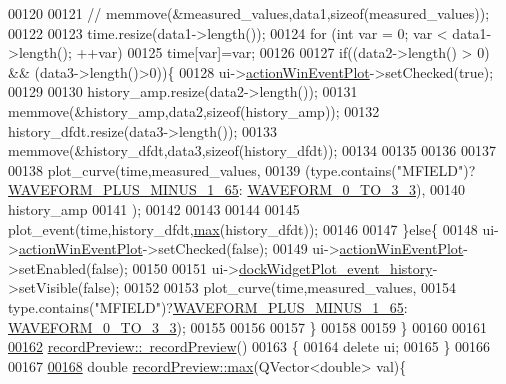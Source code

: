 \begin{DoxyCode}
00120 
00121    \textcolor{comment}{// memmove(&measured\_values,data1,sizeof(measured\_values));}
00122 
00123     time.resize(data1->length());
00124     \textcolor{keywordflow}{for} (\textcolor{keywordtype}{int} var = 0; var < data1->length(); ++var)
00125         time[var]=var;
00126 
00127     \textcolor{keywordflow}{if}((data2->length() > 0) && (data3->length()>0))\{
00128         ui->\hyperlink{a00081_ac72ec9c8679d46fd43a87f99ee6db893}{actionWinEventPlot}->setChecked(\textcolor{keyword}{true});
00129 
00130         history\_amp.resize(data2->length());
00131         memmove(&history\_amp,data2,\textcolor{keyword}{sizeof}(history\_amp));
00132         history\_dfdt.resize(data3->length());
00133         memmove(&history\_dfdt,data3,\textcolor{keyword}{sizeof}(history\_dfdt));
00134 
00135 
00136 
00137 
00138         plot\_curve(time,measured\_values,
00139                   (type.contains(\textcolor{stringliteral}{"MFIELD"})?\hyperlink{a00090_a0923d3b365a36e1e8c401cec964aa36f}{WAVEFORM\_PLUS\_MINUS\_1\_65}:
      \hyperlink{a00090_ae18fed2471b16a8516d721ff60671dd9}{WAVEFORM\_0\_TO\_3\_3}),
00140                   history\_amp
00141                   );
00142 
00143 
00144 
00145         plot\_event(time,history\_dfdt,\hyperlink{a00073_ad38222699419e6ac871ce2a23c6d292e}{max}(history\_dfdt));
00146 
00147     \}\textcolor{keywordflow}{else}\{
00148         ui->\hyperlink{a00081_ac72ec9c8679d46fd43a87f99ee6db893}{actionWinEventPlot}->setChecked(\textcolor{keyword}{false});
00149         ui->\hyperlink{a00081_ac72ec9c8679d46fd43a87f99ee6db893}{actionWinEventPlot}->setEnabled(\textcolor{keyword}{false});
00150 
00151         ui->\hyperlink{a00081_a2a8f7ee8d4458dd20481c8a1c29ce185}{dockWidgetPlot\_event\_history}->setVisible(\textcolor{keyword}{false});
00152 
00153         plot\_curve(time,measured\_values,
00154                   type.contains(\textcolor{stringliteral}{"MFIELD"})?\hyperlink{a00090_a0923d3b365a36e1e8c401cec964aa36f}{WAVEFORM\_PLUS\_MINUS\_1\_65}:
      \hyperlink{a00090_ae18fed2471b16a8516d721ff60671dd9}{WAVEFORM\_0\_TO\_3\_3});
00155 
00156 
00157     \}
00158 
00159 \}
00160 
00161 
\hypertarget{a00129_source_l00162}{}\hyperlink{a00073_ab04c69b9693e7a59a08a5faa6742b71f}{00162} \hyperlink{a00073_ab04c69b9693e7a59a08a5faa6742b71f}{recordPreview::~recordPreview}()
00163 \{
00164     \textcolor{keyword}{delete} ui;
00165 \}
00166 
00167 
\hypertarget{a00129_source_l00168}{}\hyperlink{a00073_ad38222699419e6ac871ce2a23c6d292e}{00168} \textcolor{keywordtype}{double} \hyperlink{a00073_ad38222699419e6ac871ce2a23c6d292e}{recordPreview::max}(QVector<double> val)\{

\end{DoxyCode}
